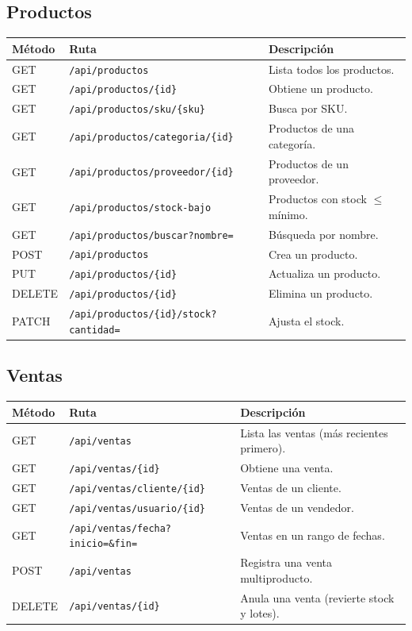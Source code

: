 \documentclass[11pt,a4paper]{article}
\begin{document}
\subsection{Productos}
\begin{longtable}{p{2cm} p{6.5cm} p{5.5cm}}
\toprule
\textbf{Método} & \textbf{Ruta} & \textbf{Descripción} \\
\midrule
\endhead
GET & \texttt{/api/productos} & Lista todos los productos. \\
GET & \texttt{/api/productos/\{id\}} & Obtiene un producto. \\
GET & \texttt{/api/productos/sku/\{sku\}} & Busca por SKU. \\
GET & \texttt{/api/productos/categoria/\{id\}} & Productos de una categoría. \\
GET & \texttt{/api/productos/proveedor/\{id\}} & Productos de un proveedor. \\
GET & \texttt{/api/productos/stock-bajo} & Productos con stock $\le$ mínimo. \\
GET & \texttt{/api/productos/buscar?nombre=} & Búsqueda por nombre. \\
POST & \texttt{/api/productos} & Crea un producto. \\
PUT & \texttt{/api/productos/\{id\}} & Actualiza un producto. \\
DELETE & \texttt{/api/productos/\{id\}} & Elimina un producto. \\
PATCH & \texttt{/api/productos/\{id\}/stock?cantidad=} & Ajusta el stock. \\
\bottomrule
\end{longtable}

\subsection{Ventas}
\begin{longtable}{p{2cm} p{6cm} p{6cm}}
\toprule
\textbf{Método} & \textbf{Ruta} & \textbf{Descripción} \\
\midrule
\endhead
GET & \texttt{/api/ventas} & Lista las ventas (más recientes primero). \\
GET & \texttt{/api/ventas/\{id\}} & Obtiene una venta. \\
GET & \texttt{/api/ventas/cliente/\{id\}} & Ventas de un cliente. \\
GET & \texttt{/api/ventas/usuario/\{id\}} & Ventas de un vendedor. \\
GET & \texttt{/api/ventas/fecha?inicio=\&fin=} & Ventas en un rango de fechas. \\
POST & \texttt{/api/ventas} & Registra una venta multiproducto. \\
DELETE & \texttt{/api/ventas/\{id\}} & Anula una venta (revierte stock y lotes). \\
\bottomrule
\end{longtable}
\end{document}
